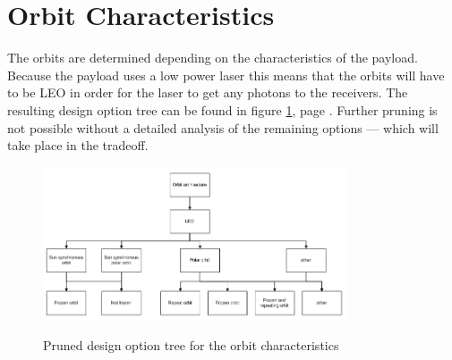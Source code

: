 \section{Orbit Characteristics}
\label{pruneOrbit}
The orbits are determined depending on the characteristics of the payload. Because the payload uses a low power laser this means that the orbits will have to be \ac{LEO} in order for the laser to get any photons to the receivers. The resulting design option tree can be found in figure \ref{fig:pruneOrbit}, page \pageref{fig:pruneOrbit}. Further pruning is not possible without a detailed analysis of the remaining options --- which will take place in the tradeoff.

\begin{figure}
\centering
\includegraphics[width=0.8\textwidth, angle=0]{chapters/img/PrunedOrbit.jpg}
\label{fig:pruneOrbit}
\caption{Pruned design option tree for the orbit characteristics}
\end{figure}